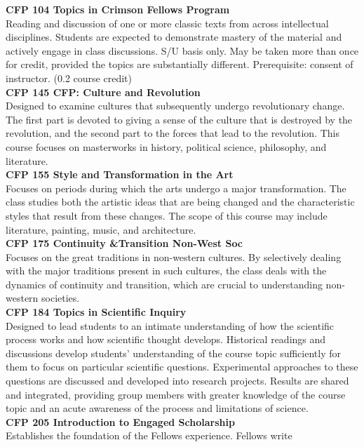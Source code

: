 \documentclass[
  letterpaper,
]{scrbook}
\begin{document}
\textbf{CFP 104 Topics in Crimson Fellows Program}\\
Reading and discussion of one or more classic texts from across
intellectual disciplines. Students are expected to demonstrate mastery
of the material and actively engage in class discussions. S/U basis
only. May be taken more than once for credit, provided the topics are
substantially different. Prerequisite: consent of instructor. (0.2
course credit)\\
\textbf{CFP 145 CFP: Culture and Revolution}\\
Designed to examine cultures that subsequently undergo revolutionary
change. The first part is devoted to giving a sense of the culture that
is destroyed by the revolution, and the second part to the forces that
lead to the revolution. This course focuses on masterworks in history,
political science, philosophy, and literature.\\
\textbf{CFP 155 Style and Transformation in the Art}\\
Focuses on periods during which the arts undergo a major transformation.
The class studies both the artistic ideas that are being changed and the
characteristic styles that result from these changes. The scope of this
course may include literature, painting, music, and architecture.\\
\textbf{CFP 175 Continuity \&Transition Non-West Soc}\\
Focuses on the great traditions in non-western cultures. By selectively
dealing with the major traditions present in such cultures, the class
deals with the dynamics of continuity and transition, which are crucial
to understanding non-western societies.\\
\textbf{CFP 184 Topics in Scientific Inquiry}\\
Designed to lead students to an intimate understanding of how the
scientific process works and how scientific thought develops. Historical
readings and discussions develop students' understanding of the course
topic sufficiently for them to focus on particular scientific questions.
Experimental approaches to these questions are discussed and developed
into research projects. Results are shared and integrated, providing
group members with greater knowledge of the course topic and an acute
awareness of the process and limitations of science.\\
\textbf{CFP 205 Introduction to Engaged Scholarship}\\
Establishes the foundation of the Fellows experience. Fellows write
\end{document}
